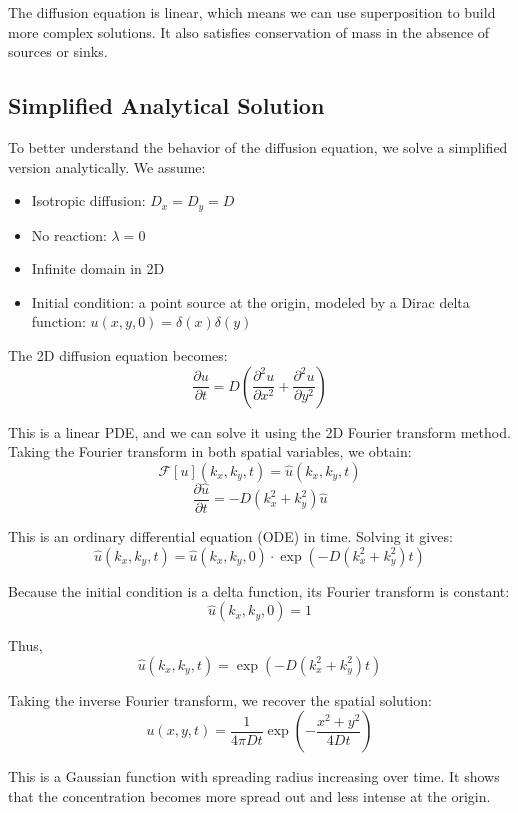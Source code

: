 \documentclass[11pt, a4paper]{article}
\begin{document}
The diffusion equation is linear, which means we can use superposition to build more complex solutions. It also satisfies conservation of mass in the absence of sources or sinks.

\subsection{Simplified Analytical Solution}
To better understand the behavior of the diffusion equation, we solve a simplified version analytically. We assume:
\begin{itemize}
    \item Isotropic diffusion: \( D_x = D_y = D \)
    \item No reaction: \( \lambda = 0 \)
    \item Infinite domain in 2D
    \item Initial condition: a point source at the origin, modeled by a Dirac delta function: \( u(x, y, 0) = \delta(x) \delta(y) \)
\end{itemize}

The 2D diffusion equation becomes:
\[
\frac{\partial u}{\partial t} = D \left( \frac{\partial^2 u}{\partial x^2} + \frac{\partial^2 u}{\partial y^2} \right)
\]

This is a linear PDE, and we can solve it using the 2D Fourier transform method. Taking the Fourier transform in both spatial variables, we obtain:
\[
\mathcal{F}[u](k_x, k_y, t) = \hat{u}(k_x, k_y, t)
\]
\[
\frac{\partial \hat{u}}{\partial t} = -D (k_x^2 + k_y^2) \hat{u}
\]

This is an ordinary differential equation (ODE) in time. Solving it gives:
\[
\hat{u}(k_x, k_y, t) = \hat{u}(k_x, k_y, 0) \cdot \exp\left( -D (k_x^2 + k_y^2) t \right)
\]

Because the initial condition is a delta function, its Fourier transform is constant:
\[
\hat{u}(k_x, k_y, 0) = 1
\]

Thus,
\[
\hat{u}(k_x, k_y, t) = \exp\left( -D (k_x^2 + k_y^2) t \right)
\]

Taking the inverse Fourier transform, we recover the spatial solution:
\[
u(x, y, t) = \frac{1}{4\pi D t} \exp\left( -\frac{x^2 + y^2}{4Dt} \right)
\]

This is a Gaussian function with spreading radius increasing over time. It shows that the concentration becomes more spread out and less intense at the origin.
\end{document}
